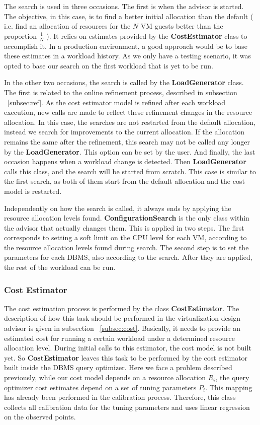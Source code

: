 \documentclass[jidm,a4paper]{jidm} %
\begin{document}
The search is used in three occasions. The first is when the advisor is started. The objective, in this case, is to find a better initial allocation than the default ( i.e. find an allocation of resources for the $N$ VM guests better than the proportion $\frac{1}{N}$ ). It relies on estimates provided by the \textbf{CostEstimator} class to accomplish it. In a production environment, a good approach would be to base these estimates in a workload history. As we only have a testing scenario, it was opted to base our search on the first workload that is yet to be run.

In the other two occasions, the search is called by the \textbf{LoadGenerator} class. The first is related to the online refinement process, described in subsection ~\ref{subsec:ref}. As the cost estimator model is refined after each workload execution, new calls are made to reflect these refinement changes in the resource allocation. In this case, the searches are not restarted from the default allocation, instead we search for improvements to the current allocation. If the allocation remains the same after the refinement, this search may not be called any longer by the \textbf{LoadGenerator}. This option can be set by the user. And finally, the last occasion happens when a workload change is detected. Then \textbf{LoadGenerator} calls this class, and the search will be started from scratch. This case is similar to the first search, as both of them start from the default allocation and the cost model is restarted.

Independently on how the search is called, it always ends by applying the resource allocation levels found. \textbf{ConfigurationSearch} is the only class within the advisor that actually changes them. This is applied in two steps. The first corresponds to setting a soft limit on the CPU level for each VM, according to the resource allocation levels found during search. The second step is to set the parameters for each DBMS, also according to the search. After they are applied, the rest of the workload can be run.

\subsubsection{Cost Estimator}

The cost estimation process is performed by the class \textbf{CostEstimator}. The description of how this task should be performed in the virtualization design advisor is given in subsection ~\ref{subsec:cost}. Basically, it needs to provide an estimated cost for running a certain workload under a determined resource allocation level. During initial calls to this estimator, the cost model is not built yet. So \textbf{CostEstimator} leaves this task to be performed by the cost estimator built inside the DBMS query optimizer. Here we face a problem described previously, while our cost model depends on a resource allocation $R_{i}$, the query optimizer cost estimates depend on a set of tuning parameters $P_{i}$. This mapping has already been performed in the calibration process. Therefore, this class collects all calibration data for the tuning parameters and uses linear regression on the observed points. 
\end{document}
